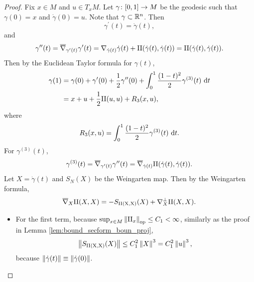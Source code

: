 \begin{proof}
    Fix $x \in M$ and $u \in T_xM$. Let $\gamma \colon [0,1] \rightarrow M$ be the geodesic such that $\gamma(0) = x$ and $\dot{\gamma}(0) = u$. Note that $\gamma \subset \mathbb{R}^n$. Then
    \begin{equation*}
        \gamma^{\prime}(t) = \dot{\gamma}(t),
    \end{equation*}
    and
    \begin{equation*}
        \gamma^{\prime\prime}(t) = \overline{\nabla}_{\gamma^\prime(t)}\gamma^\prime(t) = \nabla_{\dot{\gamma}(t)}\dot{\gamma}(t) + \mathrm{II}(\dot{\gamma}(t),\dot{\gamma}(t)) = \mathrm{II}(\dot{\gamma}(t),\dot{\gamma}(t)).
    \end{equation*}
    Then by the Euclidean Taylor formula for $\gamma(t)$,
    \begin{align*}
        \gamma(1) &= \gamma(0) + \gamma^{\prime}(0) + \frac{1}{2}\gamma^{\prime\prime}(0) + \int_0^1\frac{(1-t)^2}{2} \gamma^{(3)}(t) ~\mathrm{d}{t} \\
        &= x + u + \frac{1}{2}\mathrm{II}(u,u) + R_3(x,u),
    \end{align*}
    where
    \begin{equation*}
        R_3(x,u) = \int_0^1\frac{(1-t)^2}{2} \gamma^{(3)}(t) ~\mathrm{d}{t}.
    \end{equation*}
    For $\gamma^{(3)}(t)$,
    \begin{equation*}
        \gamma^{(3)}(t) = \overline{\nabla}_{\gamma^\prime(t)}\gamma^{\prime\prime}(t) = \overline{\nabla}_{\dot{\gamma}(t)} \mathrm{II}(\dot{\gamma}(t),\dot{\gamma}(t)).
    \end{equation*}
    Let $X = \dot{\gamma}(t)$ and $S_N(X)$ be the Weingarten map. Then by the Weingarten formula,
    \begin{equation*}
        \overline{\nabla}_{X} \mathrm{II}(X,X) = -S_{\mathrm{\mathrm{II}(X,X)}}(X) + \nabla_X^\perp \mathrm{II}(X,X).
    \end{equation*}
    \begin{itemize}
        \item For the first term, because $\sup_{x \in M}\left\lVert\mathrm{II}_x\right\lVert_{\operatorname{op}} \leq C_1 < \infty$, similarly as the proof in Lemma \ref{lem:bound_secform_boun_proj},
        \begin{equation*}
            \left\lVert S_{\mathrm{\mathrm{II}(X,X)}}(X)\right\lVert \leq C_1^2\left\lVert X\right\lVert^3 = C_1^2\left\lVert u\right\lVert^3,
        \end{equation*}
        because $\left\lVert\dot{\gamma}(t)\right\lVert \equiv \left\lVert\dot{\gamma}(0)\right\lVert$.


\end{itemize}
\end{proof}
